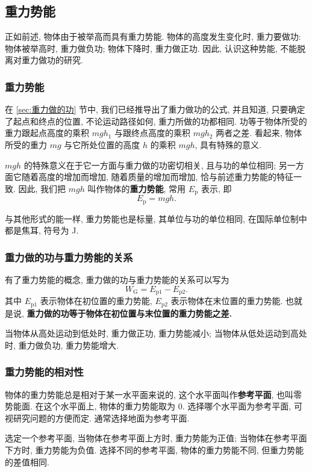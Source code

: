 \documentclass[UTF8,openany,fontset=fandol]{ctexbook}
\theoremstyle{chinesetextbook}
\begin{document}
\subsection{重力势能}
正如前述, 物体由于被举高而具有重力势能. 物体的高度发生变化时, 重力要做功: 物体被举高时, 重力做负功; 物体下降时, 重力做正功. 因此, 认识这种势能, 不能脱离对重力做功的研究.
\subsubsection{重力势能}
在 \ref{sec:重力做的功} 节中, 我们已经推导出了重力做功的公式, 并且知道, 只要确定了起点和终点的位置, 不论运动路径如何, 重力所做的功都相同. 功等于物体所受的重力跟起点高度的乘积 $mgh_1$ 与跟终点高度的乘积 $mgh_2$ 两者之差. 看起来, 物体所受的重力 $mg$ 与它所处位置的高度 $h$ 的乘积 $mgh$, 具有特殊的意义.

$mgh$ 的特殊意义在于它一方面与重力做的功密切相关, 且与功的单位相同; 另一方面它随着高度的增加而增加, 随着质量的增加而增加, 恰与前述重力势能的特征一致. 因此, 我们把 $mgh$ 叫作物体的\textbf{重力势能}, 常用 $E_\mathrm{p}$ 表示, 即
\[
E_\mathrm{p}=mgh.
\]

与其他形式的能一样, 重力势能也是标量, 其单位与功的单位相同, 在国际单位制中都是焦耳, 符号为 J.
\subsubsection{重力做的功与重力势能的关系}\label{sec:重力势能小节}
有了重力势能的概念, 重力做的功与重力势能的关系可以写为
\[
W_\text{G}=E_{\text{p}1}-E_{\text{p}2}.
\]
其中 $E_{\text{p}1}$ 表示物体在初位置的重力势能, $E_{\text{p}2}$ 表示物体在末位置的重力势能. 也就是说, \textbf{重力做的功等于物体在初位置与末位置的重力势能之差.}

当物体从高处运动到低处时, 重力做正功, 重力势能减小; 当物体从低处运动到高处时, 重力做负功, 重力势能增大.
\subsubsection{重力势能的相对性}
物体的重力势能总是相对于某一水平面来说的, 这个水平面叫作\textbf{参考平面}, 也叫零势能面. 在这个水平面上, 物体的重力势能取为 0. 选择哪个水平面为参考平面, 可视研究问题的方便而定. 通常选择地面为参考平面.

选定一个参考平面, 当物体在参考平面上方时, 重力势能为正值; 当物体在参考平面下方时, 重力势能为负值. 选择不同的参考平面, 物体的重力势能不同, 但重力势能的差值相同.
\end{document}
